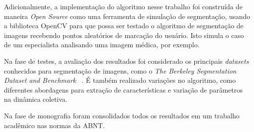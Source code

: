 Adicionalmente, a implementação do algoritmo nesse trabalho foi
construída de maneira \textit{Open Source} como uma ferramenta de
simulação de segmentação, usando a biblioteca \gls{OpenCV} para que possa
ser testado o algoritmo de segmentação de imagens recebendo pontos
aleatórios de marcação do usuário. Isto simula o caso de um
especialista analisando uma imagem médica, por exemplo.

Na fase de testes, a avaliação dos resultados foi considerado os
principais \textit{datasets} conhecidos para segmentação de imagens,
como o \textit{The Berkeley Segmentation Dataset and Benchmark}
~\cite{MartinFTM01}. É também realizado variações no algoritmo, como
diferentes abordagens para extração de características e variação de
parâmetros na dinâmica coletiva.

Na fase de monografia foram consolidados todos os resultados em um
trabalho acadêmico nas normas da \gls{ABNT}.
